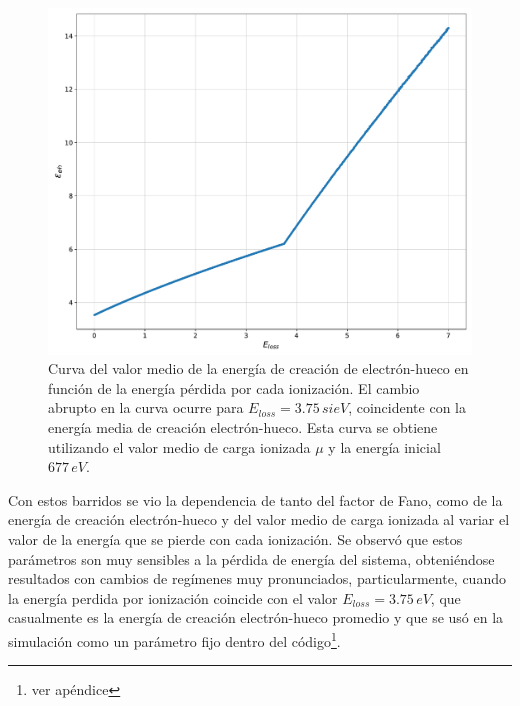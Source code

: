 \begin{figure}%
    \centering
    \includegraphics[scale=0.35]{Figs/E_eh_vs_Eloss_5ktrials_0-7Eloss.pdf}
    \caption{\footnotesize{Curva del valor medio de la energía de creación de electrón-hueco en función de la energía pérdida por cada ionización. El cambio abrupto en la curva ocurre para $E_{loss} = 3.75\,si{eV}$, coincidente con la energía media de creación electrón-hueco. Esta curva se obtiene utilizando el valor medio de carga ionizada $\mu$ y la energía inicial $677\,\si{eV}$.}}
    \label{fig:CreacionHuecoVsEloss}
\end{figure}
\indent Con estos barridos se vio la dependencia de tanto del factor de Fano, como de la energía de creación electrón-hueco y del valor medio de carga ionizada al variar el valor de la energía que se pierde con cada ionización. Se observó que estos parámetros son muy sensibles a la pérdida de energía del sistema, obteniéndose resultados con cambios de regímenes muy pronunciados, particularmente, cuando la energía perdida por ionización coincide con el valor $E_{loss} = 3.75\,\si{eV}$, que casualmente es la energía de creación electrón-hueco promedio y que se usó en la simulación como un parámetro fijo dentro del código\footnote{ver apéndice}.\\

